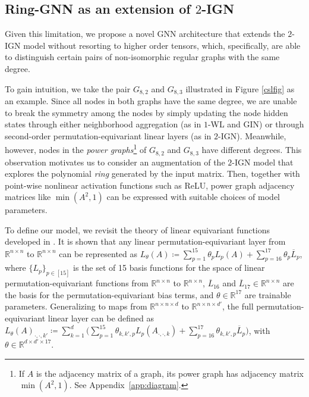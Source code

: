 \documentclass{article}
\begin{document}
\subsection{Ring-GNN as an extension of $2$-IGN}
\label{sec:ringgnn}
Given this limitation, we propose a novel GNN architecture that extends the $2$-IGN model without resorting to higher order tensors, which, specifically, are able to distinguish certain pairs of non-isomorphic regular graphs with the same degree. 

To gain intuition, we take 
the pair $G_{8, 2}$ and $G_{8,3}$ illustrated in Figure \ref{cslfig}
as an example.
Since all nodes in both graphs have the same degree, we are unable to break the symmetry among the nodes by simply updating the node hidden states through either neighborhood aggregation (as in $1$-WL and GIN) or through second-order permutation-equivariant linear layers (as in $2$-IGN). Meanwhile, however, nodes in the \textit{power graphs}\footnote{If $A$ is the adjacency matrix of a graph, its power graph has adjacency matrix $\min(A^2, 1)$. See Appendix~\ref{app:diagram}.} of $G_{8, 2}$ and $G_{8,3}$ have different degrees.
This observation motivates us to consider an augmentation of the $2$-IGN model that explores the polynomial \emph{ring} generated by the input matrix.
Then, together with point-wise nonlinear activation functions such as ReLU, power graph adjacency matrices like $\min(A^2, 1)$ can be expressed with suitable choices of model parameters. 

To define our model, we revisit the theory of linear equivariant functions developed in \cite{maron2018invariant}.
It is shown that any linear permutation-equivariant layer from $\mathbb{R}^{n \times n}$ to $\mathbb{R}^{n \times n}$ can be represented as $L_\theta(A) \coloneqq \sum_{p=1}^{15} \theta_p L_p(A) + \sum_{p=16}^{17} \theta_p \overline{L}_p$, where $\{L_p\}_{p \in [15]}$ is the set of 15 basis functions
for the space of linear permutation-equivariant functions from $\mathbb{R}^{n \times n}$ to $\mathbb{R}^{n \times n}$, $\overline{L}_{16}$ and $\overline{L}_{17} \in \mathbb{R}^{n \times n}$ are the basis for the permutation-equivariant bias terms, and $\theta \in \mathbb{R}^{17}$ are trainable parameters. Generalizing to maps from $\mathbb{R}^{n \times n \times d}$ to $\mathbb{R}^{n \times n \times d'}$, the full permutation-equivariant linear layer can be defined as $L_{\theta}(A)_{\cdot,\cdot,k'} \coloneqq \sum_{k=1}^d \big ( \sum_{p=1}^{15} \theta_{k, k', p} L_p(A_{\cdot, \cdot, k}) + \sum_{p=16}^{17} \theta_{k, k', p} \overline{L}_p \big )$, with $\theta \in \mathbb{R}^{d \times d' \times 17}$.
\end{document}
